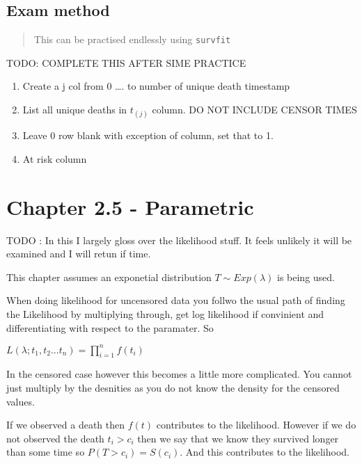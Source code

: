 \documentclass[
  letterpaper,
  DIV=11,
  numbers=noendperiod]{scrreprt}
\providecommand{\tightlist}{%
  \setlength{\itemsep}{0pt}\setlength{\parskip}{0pt}}\usepackage{longtable,booktabs,array}
\begin{document}
\hypertarget{exam-method}{%
\subsection{Exam method}\label{exam-method}}

\begin{quote}
This can be practised endlessly using \texttt{survfit}
\end{quote}

TODO: COMPLETE THIS AFTER SIME PRACTICE

\begin{enumerate}
\def\labelenumi{\arabic{enumi})}
\tightlist
\item
  Create a j col from 0 \ldots. to number of unique death timestamp
\item
  List all unique deaths in \(t_{(j)}\) column. DO NOT INCLUDE CENSOR
  TIMES
\item
  Leave 0 row blank with exception of  column, set that to 1.
\item
  At risk column
\end{enumerate}

\hypertarget{chapter-2.5---parametric}{%
\section{Chapter 2.5 - Parametric}\label{chapter-2.5---parametric}}

TODO : In this I largely gloss over the likelihood stuff. It feels
unlikely it will be examined and I will retun if time.

This chapter assumes an exponetial distribution \(T \sim Exp(\lambda)\)
is being used.

When doing likelihood for uncensored data you follwo the usual path of
finding the Likelihood by multiplying through, get log likelihood if
convinient and differentiating with respect to the paramater. So

\(L(\lambda ; t_1, t_2 ... t_n) = \prod^n_{i=1}f(t_i)\)

In the censored case however this becomes a little more complicated. You
cannot just multiply by the desnities as you do not know the density for
the censored values.

If we observed a death then \(f(t)\) contributes to the likelihood.
However if we do not observed the death \(t_i > c_i\) then we say that
we know they survived longer than some time so \(P(T > c_i) = S(c_i)\).
And this contributes to the likelihood.
\end{document}

